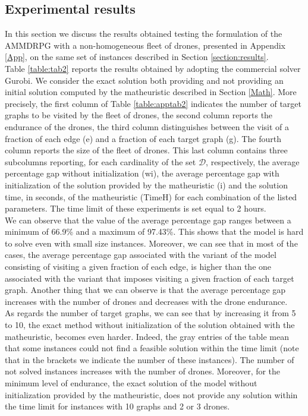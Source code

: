 \documentclass[10pt,a4paper]{elsarticle}
\def\AMD{{\sf AMMDRPG\xspace}}
\newcommand{\EN}[1]{{\color{black}#1}}
\begin{document}
			\subsection*{Experimental results}
			\noindent
			In this section we discuss the results obtained testing the formulation of the \AMD\xspace with a non\EN{-}homogeneous fleet of drones, presented in Appendix \ref{App}, on the same set of instances described in Section \ref{section:results}.\\
			\noindent
			Table \ref{table:tab2} reports the results obtained by adopting the commercial solver Gurobi. We consider the exact solution both providing and not providing an initial solution computed by the matheuristic described in Section \ref{Math}. More precisely, the first column of Table \ref{table:apptab2} indicates the number of target graphs to be visited by the fleet of drones, the second column reports the endurance of the drones, the third column distinguishes between the visit of a fraction of each edge (e) and a fraction of each target graph (g). The fourth column reports the size of the fleet of drones. This last column contains three subcolumns reporting, for each cardinality of the set $\mathcal D$, respectively, the average percentage gap without initialization (wi), the average percentage gap with initialization of the solution provided by the matheuristic (i) and the solution time, in seconds, of the matheuristic (TimeH) for each combination of the listed parameters. The time limit of these experiments is set equal to 2 hours.\\
			We can observe that the value of the average percentage gap ranges between a minimum of 66.9\% and a maximum of 97.43\%. This shows that the model is hard to \EN{solve} even with small size instances. Moreover, we can see that in most of the cases, the average percentage gap associated with the variant of the model consisting \EN{of} visiting a given fraction of each edge, is higher than the one associated with the variant that imposes \EN{visiting} a given fraction of each target graph. Another thing that we can observe is that the average percentage gap increases with the number of drones and decreases with the drone endurance.\\
			\noindent
			As regards the number of target graphs, we can see that by increasing it from 5 to 10, the exact method without initialization of the solution obtained with the matheuristic, becomes even harder. Indeed, the gray entries of the table mean that some instances could not find a feasible solution within the time limit (note that in the brackets we indicate the number of these instances). The number of not solved instances increases with the number of drones. Moreover, for the minimum level of endurance, the exact solution of the model without initialization provided by the matheuristic, does not provide any solution within the time limit for instances with 10 graphs and 2 or 3 drones.\\
\end{document}
